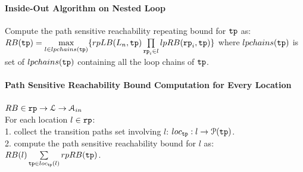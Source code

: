 \paragraph*{Inside-Out Algorithm on Nested Loop}
Compute the path sensitive reachability repeating bound for $\mathtt{tp}$ as:
\\
$RB(\mathtt{tp}) = \max\limits_{l \in lpchains(\mathtt{tp})} \{rpLB(L_n, \mathtt{tp}) \prod\limits_{\mathtt{rp}_i \in l} 
lpRB(\mathtt{rp}_i, \mathtt{tp}) \}$
where $lpchains(\mathtt{tp})$ is set of $lpchains(\mathtt{tp})$ containing all the loop chains of $\mathtt{tp}$.

\paragraph*{Path Sensitive Reachability Bound Computation for Every Location}
$RB \in \mathtt{rp} \to \mathcal{L} \to \mathcal{A}_{in}$
\\
For each location $l \in \mathtt{rp}$:
\\
1. collect the transition paths set involving $l$: $loc_{\mathtt{tp}} : l \to \mathcal{P}(\mathtt{tp})$.
\\
2. compute the path sensitive reachability bound for $l$ as:
\\
$RB(l) \sum\limits_{\mathtt{tp} \in loc_{\mathtt{tp}}(l)} rpRB(\mathtt{tp})$.
